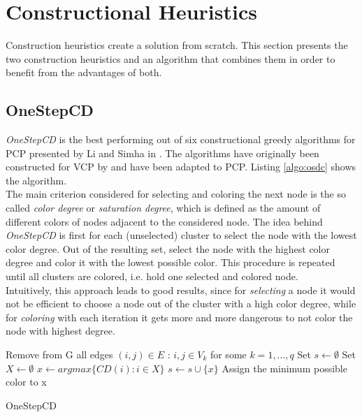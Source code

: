 \section{Constructional Heuristics}
\label{sec:construction}
Construction heuristics create a solution from scratch. This section presents the two construction heuristics and an algorithm that combines them in order to benefit from the advantages of both.
\subsection{OneStepCD}
\textit{OneStepCD} is the best performing out of six constructional greedy algorithms for PCP presented by Li and Simha in \cite{li-00}. The algorithms have originally been constructed for VCP by \cite{brelaz-79} and have been adapted to PCP. Listing \ref{algo:osdc} shows the algorithm.\\
The main criterion considered for selecting and coloring the next node is the so called \textit{color degree} or \textit{saturation degree}, which is defined as the amount of different colors of nodes adjacent to the considered node. The idea behind \textit{OneStepCD} is first for each (unselected) cluster to select the node with the lowest color degree. Out of the resulting set, select the node with the highest color degree and color it with the lowest possible color. This procedure is repeated until all clusters are colored, i.e. hold one selected and colored node.\\
Intuitively, this approach leads to good results, since for \textit{selecting} a node it would not be efficient to choose a node out of the cluster with a high color degree, while for \textit{coloring} with each iteration it gets more and more dangerous to not color the node with highest degree.

\begin{algorithm}[h]
Remove from G all edges $(i,j) \in E$ : $i,j \in V_k$ for some $k=1,\ldots,q$\; 
Set $s \gets \emptyset $\;
 {
  Set $X \gets \emptyset $\;
  $x \gets argmax\{CD(i) : i \in X \}$\;
  $s \gets s \cup \{x\}$\;
  Assign the minimum possible color to x\;
}
\;
\caption{OneStepCD}
\label{algo:osdc}
\end{algorithm}

